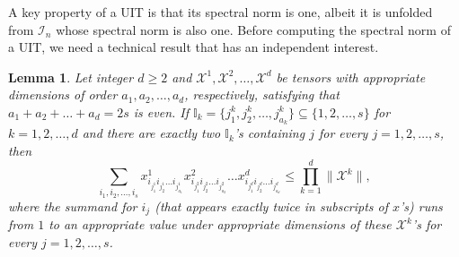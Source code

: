 \documentclass[11pt]{article}
\newtheorem{lemma}[theorem]{Lemma}
\newcommand{\BI}{\mathbb{I}}
\newcommand{\X}{\mathcal{X}}
\newcommand{\II}{\mathcal{I}}
\begin{document}
A key property of a UIT is that its spectral norm is one, albeit it is unfolded from $\II_n$ whose spectral norm is also one. Before computing the spectral norm of a UIT, we need a technical result that has an independent interest.
\begin{lemma}\label{thm:product2}
Let integer $d\ge2$ and $\X^1,\X^2,\dots,\X^d$ be tensors with appropriate dimensions of order $a_1,a_2,\dots,a_d$, respectively, satisfying that $a_1+a_2+\dots+a_d=2s$ is even. If $\BI_k=\{j^k_1,j^k_2,\dots,j^k_{a_k}\}\subseteq\{1,2,\dots,s\}$ for $k=1,2,\dots,d$ and there are exactly two $\BI_k$'s containing $j$ for every $j=1,2,\dots,s$, then
\begin{equation} \label{eq:product}
\sum_{i_1,i_2,\dots,i_{s}} x^{1}_{i_{j^1_1} i_{j^1_2}\dots i_{j^1_{a_1}}} x^{2}_{i_{j^2_1} i_{j^2_2}\dots i_{j^2_{a_2}}} \dots x^{d}_{i_{j^d_1} i_{j^d_2} \dots i_{j^d_{a_d}}} \le \prod_{k=1}^d\|\X^k\|,
\end{equation}
where the summand for $i_j$ (that appears exactly twice in subscripts of $x$'s) runs from $1$ to an appropriate value under appropriate dimensions of these $\X^k$'s for every $j=1,2,\dots,s$.
\end{lemma}
\end{document}
